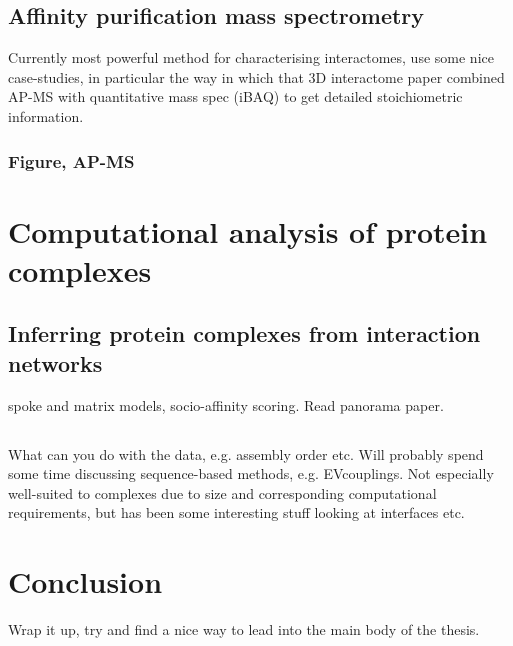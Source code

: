 \documentclass[a4paper,11pt,twoside,openright]{book}
\let\cite\supercite
\begin{document}
\subsection{Affinity purification mass spectrometry}
Currently most powerful method for characterising interactomes, use some nice case-studies, in particular the way in which that 3D interactome paper \cite{Hein2015} combined AP-MS with quantitative mass spec (iBAQ) to get detailed stoichiometric information.

\subsubsection{Figure, AP-MS}

\section{Computational analysis of protein complexes}
\subsection{Inferring protein complexes from interaction networks}
spoke and matrix models, socio-affinity scoring. Read panorama paper. \cite{Wan2015}
\subsection{}

What can you do with the data, e.g. assembly order etc. Will probably spend some time discussing sequence-based methods, e.g. EVcouplings. Not especially well-suited to complexes due to size and corresponding computational requirements, but has been some interesting stuff looking at interfaces etc.

\section{Conclusion}
Wrap it up, try and find a nice way to lead into the main body of the thesis.

\printbibliography
\end{document}
